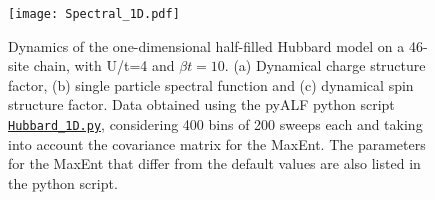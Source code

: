 \begin{figure}
\center
\texttt{[image: Spectral\_1D.pdf]}

\caption{Dynamics of the one-dimensional half-filled Hubbard model  on a 46-site chain, with U/t=4 and $\beta t = 10$.  (a) Dynamical charge structure factor, (b) single particle spectral function and (c) dynamical spin structure factor.  Data obtained using the pyALF python script 
 \href{https://git.physik.uni-wuerzburg.de/ALF/ALF/-/blob/master/Documentation/Figures/MaxEnt/Hubbard_1D.py}{\texttt{Hubbard\_1D.py}}, considering 400 bins of 200 sweeps each and taking into account the covariance matrix for the MaxEnt.  The parameters for the MaxEnt  that differ from the default values are also listed in the python script.}
        \label{Fig:Spectral1D}
\end{figure}

